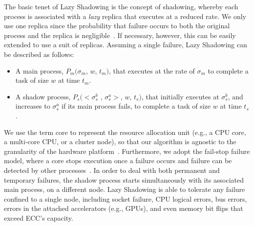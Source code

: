The basic tenet of Lazy Shadowing is the concept of shadowing, whereby each process is associated with a {\it lazy} replica that executes at a reduced rate. We only use one replica since the probability that failure occurs to both the original process and the replica is negligible~\cite{casanova_inria_2012}. %
If necessary, however, this can be easily extended to use a suit of replicas. Assuming a single failure, Lazy Shadowing can be described as follows:
\begin{itemize}
	\item A main process, $P_m(\sigma_m$, $w$, $t_m)$, that executes at the rate of $\sigma_m$ to complete a task of size $w$ at time $t_m$.
	\item A shadow process, $P_s(<\sigma_s^b$ , $\sigma_s^a>$, $w$, $t_s)$, that initially executes at $\sigma_s^b$, and increases to $\sigma_s^a$ if its main process fails, to complete a task of size $w$ at time $t_s$.%
\end{itemize}


We use the term core to represent the resource allocation unit (e.g., a
CPU core, a multi-core CPU, or a cluster node), so that our algorithm is agnostic to the
granularity of the hardware platform~\cite{casanova_inria_2012}.
Furthermore, we adopt the
fail-stop failure model, where a core stops execution once a failure
occurs and failure can be detected by other
processes~\cite{gartner_faults_1999,cristian_comm_1991}.
In order to deal with both permanent and temporary failures, the shadow process starts simultaneously with its associated main process, on a different node. Lazy Shadowing is able to tolerate any failure confined to a single node, including socket failure, CPU logical errors, bus errors, errors in the attached accelerators (e.g., GPUs), and even memory bit flips that exceed ECC's capacity. 

